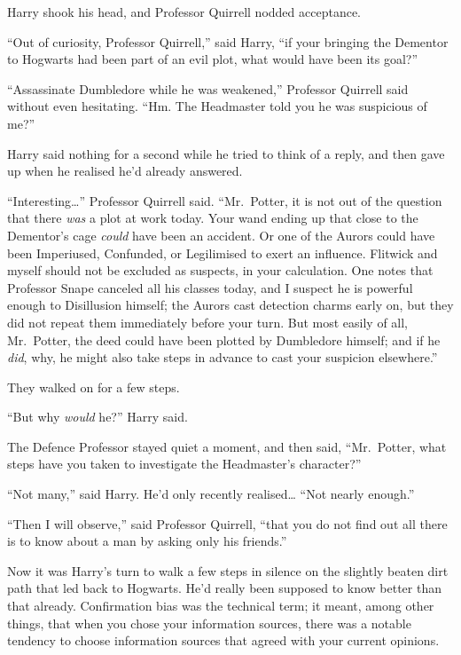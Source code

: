 Harry shook his head, and Professor Quirrell nodded acceptance.

``Out of curiosity, Professor Quirrell,'' said Harry, ``if your bringing
the Dementor to Hogwarts had been part of an evil plot, what would have
been its goal?''

``Assassinate Dumbledore while he was weakened,'' Professor Quirrell
said without even hesitating. ``Hm. The Headmaster told you he was
suspicious of me?''

Harry said nothing for a second while he tried to think of a reply, and
then gave up when he realised he'd already answered.

``Interesting\ldots{}'' Professor Quirrell said. ``Mr.~Potter, it is not
out of the question that there \emph{was} a plot at work today. Your
wand ending up that close to the Dementor's cage \emph{could} have been
an accident. Or one of the Aurors could have been Imperiused, Confunded,
or Legilimised to exert an influence. Flitwick and myself should not be
excluded as suspects, in your calculation. One notes that Professor
Snape canceled all his classes today, and I suspect he is powerful
enough to Disillusion himself; the Aurors cast detection charms early
on, but they did not repeat them immediately before your turn. But most
easily of all, Mr.~Potter, the deed could have been plotted by
Dumbledore himself; and if he \emph{did}, why, he might also take steps
in advance to cast your suspicion elsewhere.''

They walked on for a few steps.

``But why \emph{would} he?'' Harry said.

The Defence Professor stayed quiet a moment, and then said,
``Mr.~Potter, what steps have you taken to investigate the Headmaster's
character?''

``Not many,'' said Harry. He'd only recently realised\ldots{} ``Not
nearly enough.''

``Then I will observe,'' said Professor Quirrell, ``that you do not find
out all there is to know about a man by asking only his friends.''

Now it was Harry's turn to walk a few steps in silence on the slightly
beaten dirt path that led back to Hogwarts. He'd really been supposed to
know better than that already. Confirmation bias was the technical term;
it meant, among other things, that when you chose your information
sources, there was a notable tendency to choose information sources that
agreed with your current opinions.

